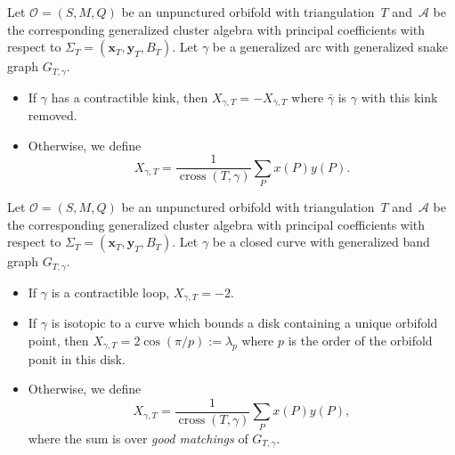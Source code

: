 \begin{Definition}\label{def:genArc}
Let $\mathcal{O} = (S,M,Q)$ be an unpunctured orbifold with triangulation~$T$ and~$\mathcal{A}$ be the corresponding generalized cluster algebra with principal coefficients with respect to $\Sigma_T = (\mathbf{x}_T,\mathbf{y}_T,B_T)$. Let $\gamma$ be a generalized arc with generalized snake graph $G_{T,\gamma}$.
\begin{itemize}\itemsep=0pt
 \item If $\gamma$ has a contractible kink, then $X_{\gamma,T} = -X_{\bar{\gamma},T}$ where $\bar{\gamma}$ is $\gamma$ with this kink removed.
 \item Otherwise, we define \[X_{\gamma,T} = \frac{1}{\operatorname{cross}(T,\gamma)} \sum_P x(P)y(P). \]
\end{itemize}
\end{Definition}

\begin{Definition}\label{def:closedcurve}
Let $\mathcal{O} = (S,M,Q)$ be an unpunctured orbifold with triangulation~$T$ and~$\mathcal{A}$ be the corresponding generalized cluster algebra with principal coefficients with respect to $\Sigma_T = (\mathbf{x}_T,\mathbf{y}_T,B_T)$. Let $\gamma$ be a closed curve with generalized band graph $G_{T,\gamma}$.
\begin{itemize}\itemsep=0pt
 \item If $\gamma$ is a contractible loop, $X_{\gamma,T} = -2$.
 \item If $\gamma$ is isotopic to a curve which bounds a disk containing a unique orbifold point, then $X_{\gamma,T} = 2\cos(\pi/p):= \lambda_p$ where $p$ is the order of the orbifold ponit in this disk.
 \item Otherwise, we define \[X_{\gamma,T} = \frac{1}{\operatorname{cross}(T,\gamma)} \sum_P x(P)y(P), \]
 where the sum is over \emph{good matchings} of $G_{T,\gamma}$.
\end{itemize}
\end{Definition}
